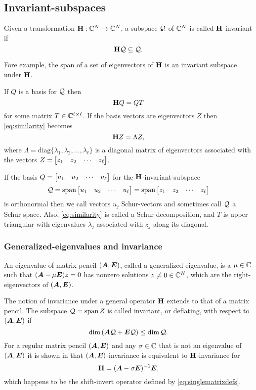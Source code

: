 \subsection{Invariant-subspaces }\label{sec:invariant_subspaces }

Given a transformation $\textbf{\textup{H}}:\mathbb{C}^N \rightarrow \mathbb{C}^N$, a subspace  $\mathcal{Q}$ of $\mathbb{C}^N$ is called $\textbf{\textup{H}}$-invariant if
\begin{equation}
\textbf{\textup{H}}\mathcal{Q} \subseteq \mathcal{Q}.
\label{eq:op_invariance}
\end{equation}

Fore example, the span of a set of eigenvectors of $\textbf{\textup{H}}$ is an invariant subspace under $\textbf{\textup{H}}$.


If $Q$ is a basis for $\mathcal{Q}$ then
\begin{equation}
\textbf{\textup{H}} Q = Q T
\label{eq:similarity}
\end{equation}
for some matrix $T\in\mathbb{C}^{\ell\times\ell}$.  If the basis vectors are eigenvectors $Z$ then \eqref{eq:similarity} becomes
\[
\textbf{\textup{H}} Z = \Lambda Z,
\] 
where $\Lambda = \text{diag} \{ \lambda_1, \lambda_2, ...,\lambda_\ell \}$ is a diagonal matrix of eigenvectors associated with the vectors
 $Z = \begin{bmatrix} z_1 & z_2 & \cdots & z_\ell\end{bmatrix}$. 

If the basis $Q=\begin{bmatrix} u_1 & u_2 & \cdots & u_\ell\end{bmatrix}$ for the $\textbf{\textup{H}}$-invariant-subspace  
\[
\mathcal{Q} = \operatorname*{span} \begin{bmatrix} u_1 & u_2 & \cdots & u_\ell\end{bmatrix}=\operatorname*{span} \begin{bmatrix} z_1 & z_2 & \cdots & z_\ell\end{bmatrix}
\] 
is orthonormal then we call vectors $u_j$ Schur-vectors and sometimes call $\mathcal{Q}$ a Schur space.   Also, \eqref{eq:similarity} is called a Schur-decomposition, and $T$ is upper triangular with eigenvalues $\lambda_j$ associated with $z_j$ along its diagonal.   


\medskip
\subsubsection{Generalized-eigenvalues and invariance}
 An eigenvalue  of  matrix pencil $(\bm{A},\bm{E})$, called  a generalized eigenvalue, is a $\mu\in\mathbb{C}$ such that $(\bm{A}-\mu \bm{E})z=0$ has nonzero solutions $z\neq 0\in\mathbb{C}^N$, which are the right-eigenvectors of $(\bm{A},\bm{E})$.

\bigskip
The notion of invariance under a general operator $\textbf{\textup{H}}$ extends to that of a matrix pencil. The subspace  $\mathcal{Q} = \operatorname*{span} Z$ is  called invariant, or deflating, \cite{stewart1972sensitivity} with respect to $(\bm{A},\bm{E})$ if
\begin{equation}
\dim \left(\bm{A} \mathcal{Q} + \bm{E} \mathcal{Q}  \right) \leq \dim \mathcal{Q}.
\label{eq:generalized_invariance1}
\end{equation}
 For a regular matrix pencil $(\bm{A},\bm{E})$ and any $\sigma\in\mathbb{C}$ that is not an eigenvalue of $(\bm{A},\bm{E})$ it is shown in \cite{gracia1995stability} that $(\bm{A},\bm{E})$-invariance is equivalent to $\textbf{\textup{H}}$-invariance for 
\begin{equation}
\textbf{\textup{H}} = (\bm{A}-\sigma \bm{E})^{-1} \bm{E}, 
\label{eq:AE}
\end{equation}
which happens to be the shift-invert operator defined by \eqref{eq:singlematrixdefs}.   

